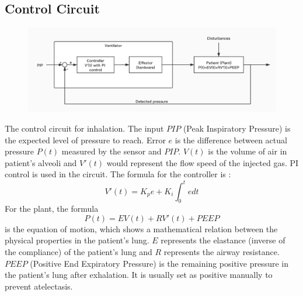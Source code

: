 \documentclass{article}
\begin{document}
\subsection{Control Circuit}
\begin{figure}[h]
\centering
\includegraphics[scale=0.23]{control-circuit.jpg}
\end{figure}

The control circuit for inhalation. The input $PIP$ (Peak Inspiratory Pressure) is the expected level of pressure to reach. Error $e$ is the difference between actual pressure $P(t)$ measured by the sensor and $PIP$. $V(t)$ is the volume of air in patient's alveoli and $V'(t)$ would represent the flow speed of the injected gas. PI control is used in the circuit. The formula for the controller is :
$$V'(t)=K_pe+K_i\int _0^tedt$$
For the plant, the formula
$$P(t)=EV(t)+RV'(t)+PEEP$$
is the equation of motion, which shows a mathematical relation between the physical properties in the patient's lung. $E$ represents the elastance (inverse of the compliance) of the patient's lung and $R$ represents the airway resistance. $PEEP$ (Positive End Expiratory Pressure) is the remaining positive pressure in the patient's lung after exhalation. It is usually set as positive manually to prevent atelectasis.

\newpage
\end{document}

